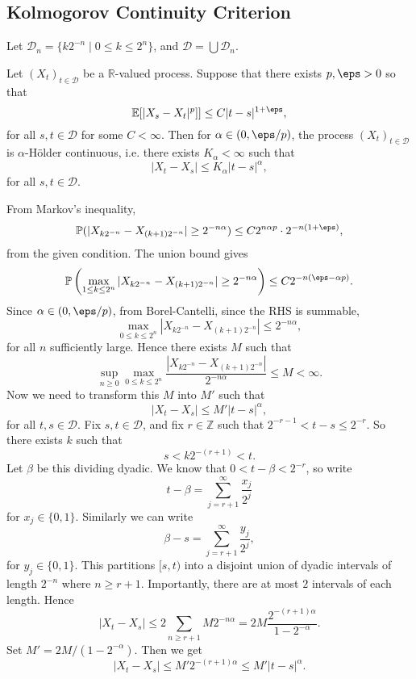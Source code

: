 \documentclass[12pt]{article}
\begin{document}
\subsection{Kolmogorov Continuity Criterion}%
\label{sub:kcc}

Let $\mathcal{D}_n = \{k 2^{-n} \mid 0 \leq k \leq 2^{n}\}$, and $\mathcal{D} = \bigcup \mathcal{D}_n$.

\begin{theorem}
	Let $(X_t)_{t \in \mathcal{D}}$ be a $\mathbb{R}$-valued process. Suppose that there exists $p, \eps > 0$ so that
	\[
		\mathbb{E}[|X_s - X_t|^{p}]] \leq C |t - s|^{1 + \eps},
	\]
	for all $s, t \in \mathcal{D}$ for some $C < \infty$. Then for $\alpha \in (0, \eps/p)$, the process $(X_t)_{t \in \mathcal{D}}$ is $\alpha$-H\"older continuous, i.e. there exists $K_\alpha <  \infty$ such that
	\[
	|X_t - X_s| \leq K_\alpha |t - s|^{\alpha},
	\]
	for all $s, t \in \mathcal{D}$.
\end{theorem}

\begin{proofbox}
	From Markov's inequality,
	\[
		\mathbb{P}(|X_{k2^{-n}} - X_{(k+1)2^{-n}}| \geq 2^{-n \alpha} ) \leq C 2^{n \alpha p}\cdot 2^{-n(1 + \eps)},
	\]
	from the given condition. The union bound gives
	\[
		\mathbb{P}\left( \max_{1 \leq k \leq 2^{n}} |X_{k2^{-n}} - X_{(k+1)2^{-n}}| \geq 2^{-n \alpha}\right) \leq C 2^{-n(\eps - \alpha p)}.
	\]
	Since $\alpha \in (0, \eps/p)$, from Borel-Cantelli, since the RHS is summable,
	\[
	\max_{0 \leq k \leq 2^{n}} |X_{k2^{-n}} - X_{(k+1)2^{-n}}| \leq 2^{-n \alpha},
	\]
	for all $n$ sufficiently large. Hence there exists $M$ such that
	\[
	\sup_{n \geq 0} \max_{0 \leq k \leq 2^{n}} \frac{|X_{k2^{-n}} - X_{(k+1)2^{-n}}|}{2^{-n\alpha}} \leq M < \infty.
	\]
	Now we need to transform this $M$ into $M'$ such that
	\[
	|X_t - X_s| \leq M' |t - s|^{\alpha},
	\]
	for all $t, s \in \mathcal{D}$. Fix $s, t \in \mathcal{D}$, and fix $r \in \mathbb{Z}$ such that $2^{-r-1} < t - s \leq 2^{-r}$. So there exists $k$ such that
	\[
	s < k2^{-(r+1)} < t.
	\]
	Let $\beta$ be this dividing dyadic. We know that $0 < t - \beta < 2^{-r}$, so write
	\[
	t - \beta = \sum_{j = r+1}^\infty \frac{x_j}{2^{j}}
	\]
	for $x_j \in \{0, 1\}$. Similarly we can write
	\[
	\beta - s = \sum_{j = r + 1}^{\infty} \frac{y_j}{2^{j}},
	\]
	for $y_j \in \{0, 1\}$. This partitions $[s, t)$ into a disjoint union of dyadic intervals of length $2^{-n}$ where $n \geq r+1$. Importantly, there are at most $2$ intervals of each length. Hence
	\[
	|X_t - X_s| \leq 2 \sum_{n \geq r + 1} M 2^{-n \alpha} = 2 M \frac{2^{-(r+1)\alpha}}{1 - 2^{-\alpha}}.
	\]
	Set $M' = 2M / (1 - 2^{-\alpha})$. Then we get
	\[
	|X_t - X_s| \leq M' 2^{-(r+1)\alpha} \leq M' |t - s|^{\alpha}.
	\]
\end{proofbox}
\end{document}
